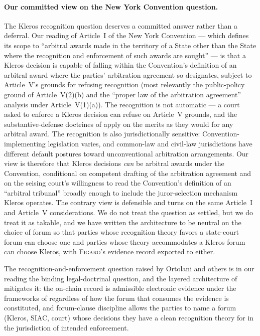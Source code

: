 \documentclass[11pt,a4paper]{article}
\theoremstyle{remark}
\newcommand{\figaro}{\textsc{Figaro}}
\begin{document}
\paragraph{Our committed view on the New York Convention question.}
The Kleros recognition question deserves a committed answer
rather than a deferral. Our reading of Article~I of the New
York Convention --- which defines its scope to ``arbitral
awards made in the territory of a State other than the State
where the recognition and enforcement of such awards are
sought'' --- is that a Kleros decision is capable of falling
within the Convention's definition of an arbitral award where
the parties' arbitration agreement so designates, subject to
Article~V's grounds for refusing recognition (most relevantly
the public-policy ground of Article~V(2)(b) and the
``proper law of the arbitration agreement'' analysis under
Article~V(1)(a)). The recognition is not automatic --- a court
asked to enforce a Kleros decision can refuse on Article~V
grounds, and the substantive-defense doctrines of
 apply on the merits as they would for any
arbitral award. The recognition is also jurisdictionally
sensitive: Convention-implementing legislation varies, and
common-law and civil-law jurisdictions have different default
postures toward unconventional arbitration arrangements. Our
view is therefore that Kleros decisions \emph{can} be arbitral
awards under the Convention, conditional on competent drafting
of the arbitration agreement and on the seising court's
willingness to read the Convention's definition of an
``arbitral tribunal'' broadly enough to include the
juror-selection mechanism Kleros operates. The contrary view
\citep[on which see][]{ortolani2019blockchain} is defensible
and turns on the same Article~I and Article~V considerations.
We do not treat the question as settled, but we do treat it as
takable, and we have written the architecture to be neutral on
the choice of forum so that parties whose recognition theory
favors a state-court forum can choose one and parties whose
theory accommodates a Kleros forum can choose Kleros, with
\figaro{}'s evidence record exported to either.

The recognition-and-enforcement question raised by Ortolani and
others is in our reading the binding legal-doctrinal question,
and the layered architecture of  mitigates
it: the on-chain record is admissible electronic evidence under
the frameworks of  regardless of how the
forum that consumes the evidence is constituted, and
forum-clause discipline allows the parties to name a forum
(Kleros, SIAC, court) whose decisions they have a clean
recognition theory for in the jurisdiction of intended
enforcement.
\end{document}
